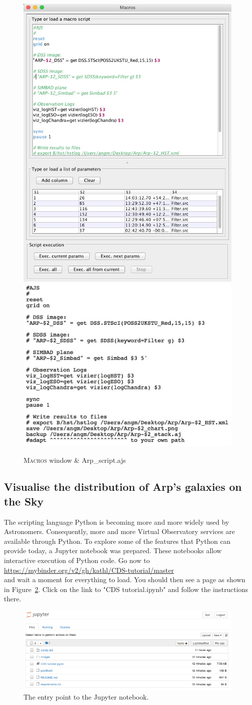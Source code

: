 \documentclass [a4paper, 12pt]{article}
\begin{document}
\begin{figure}[H]
    \center
    \includegraphics[width=0.38 \textwidth]
    {../images/aladin_macrocontroller_cdstutorial.jpg}\hspace{0.3cm}\includegraphics[width=0.6
     \textwidth]
     {../images/aladin_script_arp.jpg}
    \caption{\textsc{Macros} window \& Arp\_script.ajs }
    \label{fig:script}
\end{figure}

\subsection{Visualise the distribution of Arp's galaxies on the Sky}
The scripting language Python is becoming more and more widely used by 
Astronomers. Consequently, more and more Virtual Observatory services are 
available through Python. To explore some of the features that Python can 
provide today, a Jupyter notebook was prepared. These notebooks allow 
interactive execution of Python code. Go now to\\
\url{https://mybinder.org/v2/gh/kathl/CDS-tutorial/master}\\
and wait a moment for everything to load. You should then see a page as shown 
in Figure~\ref{fig:notebook}. Click on the link to "CDS tutorial.ipynb" and 
follow the instructions there.

\begin{figure}[H]
    \center
    \includegraphics[width=0.7 \textwidth]  
    {../images/jupyter_open-notebook.png}
    \caption{The entry point to the Jupyter notebook. }
    \label{fig:notebook}
\end{figure}
\end{document}
